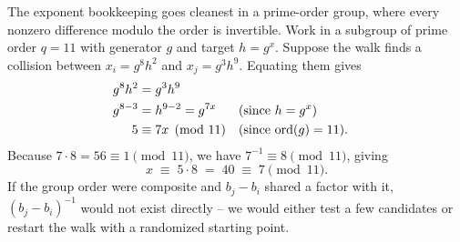 \begin{example}
\label{ch20:ex-rho}
The exponent bookkeeping goes cleanest in a prime-order
group, where every nonzero difference modulo the order is invertible. Work in a subgroup of prime order
$q = 11$ with generator $g$ and target $h = g^{x}$. Suppose the walk finds a collision between
$x_i = g^{8} h^{2}$ and $x_j = g^{3} h^{9}$. Equating them gives
\begin{align*}
  g^{8} h^{2} &= g^{3} h^{9} \\
  g^{8-3} &= h^{9-2} = g^{7x} && \text{(since $h = g^x$)} \\
  5 &\equiv 7x \pmod{11} && \text{(since $\operatorname{ord}(g) = 11$).}
\end{align*}
Because $7 \cdot 8 = 56 \equiv 1 \pmod{11}$, we have $7^{-1} \equiv 8 \pmod{11}$, giving
\[
  x \;\equiv\; 5 \cdot 8 \;=\; 40 \;\equiv\; 7 \pmod{11}.
\]
If the group order were composite and $b_j - b_i$ shared a factor with it, $(b_j - b_i)^{-1}$ would not exist directly -- we would either test a few candidates or restart the walk with a randomized starting point.
\end{example}

